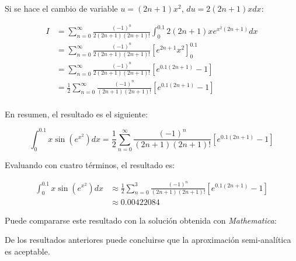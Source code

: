 \begin{ex}
\begin{solution}
        Si se hace el cambio de variable $u = (2n + 1) x^2$, $du = 2(2n + 1)x dx$:

        \begin{align*}
            I &= \sum_{n = 0}^{\infty} \frac{(-1)^n}{2(2n + 1)(2n + 1)!}
            \int_{0}^{0.1} 2(2n + 1) x e^{x^2(2n + 1)} dx \\
              &= \sum_{n = 0}^{\infty} \frac{(-1)^n}{2(2n + 1)(2n + 1)!}
              \left[e^{2n + 1}x^2 \right]_{0}^{0.1}\\
              &= \sum_{n = 0}^{\infty} \frac{(-1)^n}{2(2n + 1)(2n + 1)!}
              \left[e^{0.1(2n + 1)} - 1 \right]\\
              &= \frac{1}{2} \sum_{n = 0}^{\infty} \frac{(-1)^n}{(2n + 1)(2n
              + 1)!} \left[e^{0.1(2n + 1)} - 1 \right]\\
        \end{align*}

        En resumen, el resultado es el siguiente:

        \begin{equation*}
            \int_{0}^{0.1} x \sin(e^{x^2}) dx = \frac{1}{2} \sum_{n = 0}^{\infty} \frac{(-1)^n}{(2n + 1)(2n + 1)!} \left[e^{0.1(2n + 1)} - 1 \right]
        \end{equation*}



        Evaluando con cuatro términos, el resultado es:

        \begin{align*}
            \int_{0}^{0.1} x \sin(e^{x^2}) dx &\approx \frac{1}{2} \sum_{n = 0}^{3} \frac{(-1)^n}{(2n + 1)(2n + 1)!} \left[e^{0.1(2n + 1)} - 1 \right]\\
                                              &\approx 0.00422084
        \end{align*}

        Puede compararse este resultado con la solución obtenida con
        \textit{Mathematica}:

        \begin{center}
        \end{center}

        De los resultados anteriores puede concluirse que la aproximación
        semi-analítica es aceptable.
    \end{solution}

\end{ex}

